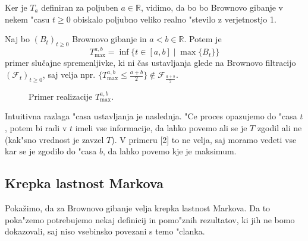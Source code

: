 \documentclass[twoside,11pt]{article}
\begin{document}
\begin{opomba}
    Ker je $T_a$ definiran za poljuben $a \in \mathbb{R}$, vidimo, da bo bo Brownovo gibanje v nekem "casu  $t\geq 0$ obiskalo poljubno veliko realno "stevilo z verjetnostjo 1.
\end{opomba}

\begin{primer}
    Naj bo $(B_t)_{t\geq0}$ Brownovo gibanje in $a < b \in \mathbb{R}$. Potem je
    $$
        T^{a, b}_{\max} = \inf\{t \in [a, b] \mid \max\{B_t\} \}
    $$
    primer slučajne spremenljivke, ki ni čas ustavljanja glede na Brownovo filtracijo $(\mathcal{F}_t)_{t\geq0}$, saj velja npr. $\{T^{a, b}_{\max} \leq \tfrac{a+b}{2}\} \not\in \mathcal{F}_{\tfrac{a+b}{2}}$.
\end{primer}



\begin{figure}[h]
    \centering
    \caption{Primer realizacije $T^{a,b}_{\max}$.}
    \label{fig:slika4}
\end{figure}

Intuitivna razlaga "casa ustavljanja je naslednja. "Ce proces opazujemo do "casa $t$, potem bi radi v $t$ imeli vse informacije, da lahko povemo
ali se je $T$ zgodil ali ne (kak"sno vrednost je zavzel $T$). V primeru [2] to ne velja, saj moramo vedeti vse kar se je zgodilo do "casa $b$, da lahko povemo kje je maksimum. 

\subsection{Krepka lastnost Markova}
Pokažimo, da za Brownovo gibanje velja krepka lastnost Markova. Da to poka"zemo potrebujemo nekaj definicij in pomo"znih rezultatov, ki jih ne bomo dokazovali, saj niso vsebinsko povezani s temo "clanka.
\end{document}
